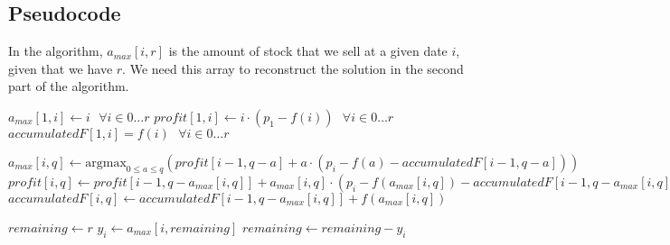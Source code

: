 \documentclass[12pt]{article}
\begin{document}
\subsection*{Pseudocode}
In the algorithm, $a_\mathit{max}[i, r]$ is the amount of stock that we sell at a given date $i$, given that we have $r$. We need this array to reconstruct the solution in the second part of the algorithm.

\begin{algorithmic}
	\State $a_\mathit{max}[1, i] \gets i \mbox{   } \forall i \in 0 \ldots r$
	\State $\mathit{profit}[1, i] \gets i \cdot (p_1 - f(i)) \mbox{   } \forall i \in 0 \ldots r$
	\State $\mathit{accumulatedF}[1, i] = f(i) \mbox{   } \forall i \in 0 \ldots r$

			\State $a_{\mathit{max}}[i, q] \gets \mbox{argmax}_{0 \leq a \leq q} (\mathit{profit}[i-1, q-a] + a \cdot (p_i - f(a) - \mathit{accumulatedF}[i-1, q-a]))$
			\State $\mathit{profit}[i, q] \gets \mathit{profit}[i-1, q-a_{\mathit{max}}[i, q]] + a_\mathit{max}[i,q] \cdot (p_i - f(a_\mathit{max}[i,q]) - \mathit{accumulatedF}[i-1, q-a_\mathit{max}[i,q]])$
			\State $\mathit{accumulatedF}[i, q] \gets \mathit{accumulatedF}[i-1, q-a_\mathit{max}[i,q]] + f(a_\mathit{max}[i,q])$
		\EndFor
	\EndFor

	\State $\mathit{remaining} \gets r$
		\State $y_i \gets a_\mathit{max}[i, \mathit{remaining}]$
		\State $\mathit{remaining} \gets \mathit{remaining} - y_i$
	\EndFor
\end{algorithmic}
\end{document}

